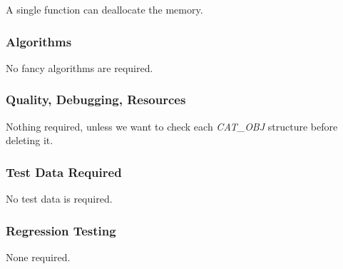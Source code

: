   A single function can deallocate the memory.

\subsubsection {Algorithms}

  No fancy algorithms are required.

\subsubsection {Quality, Debugging, Resources}

  Nothing required, unless we want to check each {\it CAT\_OBJ}
structure before deleting it.

\subsubsection {Test Data Required}

  No test data is required.

\subsubsection {Regression Testing}

  None required.



